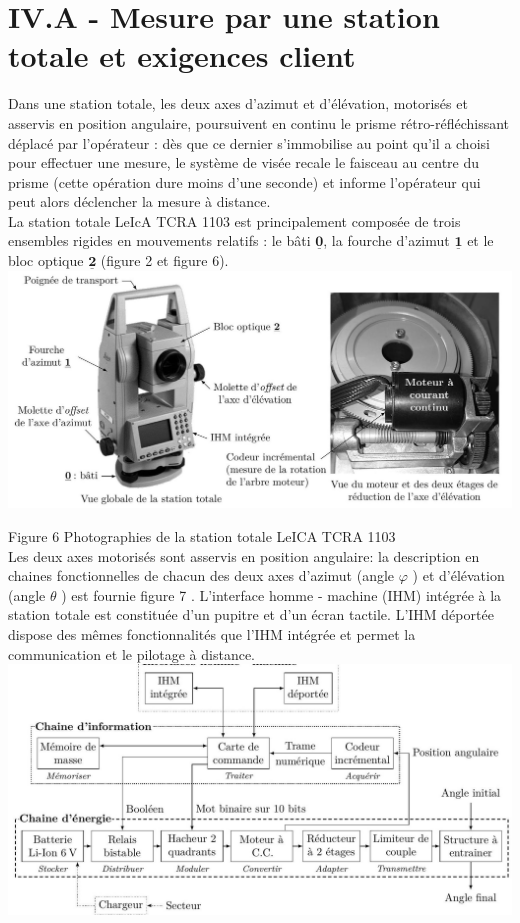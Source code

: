 \documentclass[10pt]{article}
\begin{document}
\section*{IV.A - Mesure par une station totale et exigences client}
Dans une station totale, les deux axes d'azimut et d'élévation, motorisés et asservis en position angulaire, poursuivent en continu le prisme rétro-réfléchissant déplacé par l'opérateur : dès que ce dernier s'immobilise au point qu'il a choisi pour effectuer une mesure, le système de visée recale le faisceau au centre du prisme (cette opération dure moins d'une seconde) et informe l'opérateur qui peut alors déclencher la mesure à distance.\\
La station totale LeIcA TCRA 1103 est principalement composée de trois ensembles rigides en mouvements relatifs : le bâti $\underline{\mathbf{0}}$, la fourche d'azimut $\underline{\mathbf{1}}$ et le bloc optique $\underline{\mathbf{2}}$ (figure 2 et figure 6).\\
\includegraphics[max width=\textwidth, center]{2024_12_07_51b7f57c7f055c2d8d29g-04(2)}

Figure 6 Photographies de la station totale LeICA TCRA 1103\\
Les deux axes motorisés sont asservis en position angulaire: la description en chaines fonctionnelles de chacun des deux axes d'azimut (angle $\varphi$ ) et d'élévation (angle $\theta$ ) est fournie figure 7 . L'interface homme - machine (IHM) intégrée à la station totale est constituée d'un pupitre et d'un écran tactile. L'IHM déportée dispose des mêmes fonctionnalités que l'IHM intégrée et permet la communication et le pilotage à distance.\\
\includegraphics[max width=\textwidth, center]{2024_12_07_51b7f57c7f055c2d8d29g-05}
\end{document}

